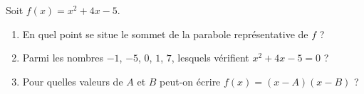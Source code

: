 
\begin{exercice}\label{exoPremiere-0095}

    Soit \( f(x)=x^2+4x-5\).
    \begin{multicols}{2}
        \begin{enumerate}
            \item
                En quel point se situe le sommet de la parabole représentative de $f$ ?
            \item
                Parmi les nombres \( -1\), \( -5\), \( 0\), \( 1\), \( 7\), lesquels vérifient \( x^2+4x-5=0\) ?
            \item
                Pour quelles valeurs de \( A\) et \( B\) peut-on écrire \( f(x)=(x-A)(x-B)\) ?
        \end{enumerate}
    \end{multicols}

\end{exercice}
